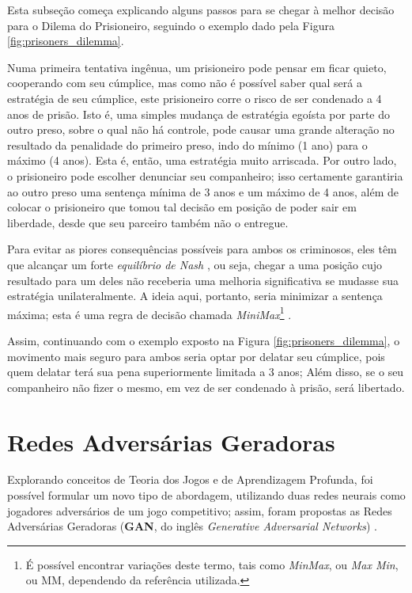 Esta subseção começa explicando alguns passos para se chegar à melhor decisão para o Dilema do Prisioneiro, seguindo o exemplo dado pela Figura \ref{fig:prisoners_dilemma}.

Numa primeira tentativa ingênua, um prisioneiro pode pensar em ficar quieto, cooperando com seu cúmplice, mas como não é possível saber qual será a estratégia de seu cúmplice, este prisioneiro corre o risco de ser condenado a 4 anos de prisão. Isto é, uma simples mudança de estratégia egoísta por parte do outro preso, sobre o qual não há controle, pode causar uma grande alteração no resultado da penalidade do primeiro preso, indo do mínimo (1 ano) para o máximo (4 anos). Esta é, então, uma estratégia muito arriscada. Por outro lado, o prisioneiro pode escolher denunciar seu companheiro; isso certamente garantiria ao outro preso uma sentença mínima de 3 anos e um máximo de 4 anos, além de colocar o prisioneiro que tomou tal decisão em posição de poder sair em liberdade, desde que seu parceiro também não o entregue.

Para evitar as piores consequências possíveis para ambos os criminosos, eles têm que alcançar um forte \textit{equilíbrio de Nash} \citep{Nash48}, ou seja, chegar a uma posição cujo resultado para um deles não receberia uma melhoria significativa se mudasse sua estratégia unilateralmente. A ideia aqui, portanto, seria minimizar a sentença máxima; esta é uma regra de decisão chamada \textit{MiniMax}\footnote{É possível encontrar variações deste termo, tais como \textit{MinMax}, ou \textit{Max Min}, ou MM, dependendo da referência utilizada.} \citep{v.Neumann1928, blackwell1956analog, willem1997minimax}.

Assim, continuando com o exemplo exposto na Figura \ref{fig:prisoners_dilemma}, o movimento mais seguro para ambos seria optar por delatar seu cúmplice, pois quem delatar terá sua pena superiormente limitada a 3 anos; Além disso, se o seu companheiro não fizer o mesmo, em vez de ser condenado à prisão, será libertado.



\section{Redes Adversárias Geradoras}
\label{sec:gan_gan}

Explorando conceitos de Teoria dos Jogos e de Aprendizagem Profunda, foi possível formular um novo tipo de abordagem, utilizando duas redes neurais como jogadores adversários de um jogo competitivo; assim, foram propostas as Redes Adversárias Geradoras (\textbf{GAN}, do inglês \textit{Generative Adversarial Networks}) \citep{NIPS2014_5423}.

